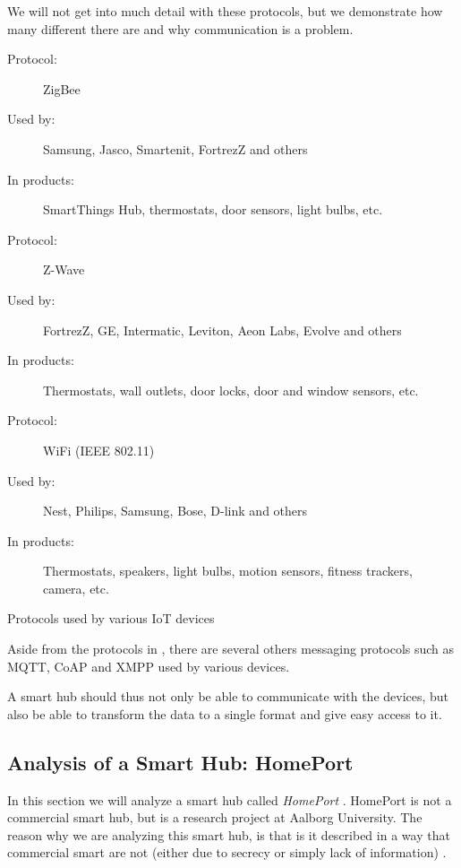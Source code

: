 We will not get into much detail with these protocols, 
but we demonstrate how many different there are and why communication is a problem.
\begin{table}
   \begin{description}
       \item[Protocol:] ZigBee
       \item[Used by:] Samsung, Jasco, Smartenit, FortrezZ and others
       \item[In products:] SmartThings Hub, thermostats, door sensors, light bulbs, etc.\\
       
       \item[Protocol:] Z-Wave
       \item[Used by:] FortrezZ, GE, Intermatic, Leviton, Aeon Labs, Evolve and others
       \item[In products:] Thermostats, wall outlets, door locks, door and window sensors, etc.  \\
       
       \item[Protocol:] WiFi (IEEE 802.11)
       \item[Used by:] Nest, Philips, Samsung, Bose, D-link and others
       \item[In products:] Thermostats, speakers, light bulbs, motion sensors, fitness trackers, camera, etc. 
    \end{description}
    \caption{Protocols used by various IoT devices}\label{table:iotprotocols}
\end{table}

Aside from the protocols in , 
there are several others messaging protocols such as MQTT, CoAP and XMPP used by various devices. 

A smart hub should thus not only be able to communicate with the devices, 
but also be able to transform the data to a single format and give easy access to it.

\subsection{Analysis of a Smart Hub: HomePort}\label{sec:homeport}
In this section we will analyze a smart hub called \emph{HomePort} \cite{HOMEPORT10}.
HomePort is not a commercial smart hub, 
but is a research project at Aalborg University. 
The reason why we are analyzing this smart hub, 
is that is it described in a way that commercial smart are not (either due to secrecy or simply lack of information) \cite{HOMEPORT09, HOMEPORT10, HOMEPORT13}.  

